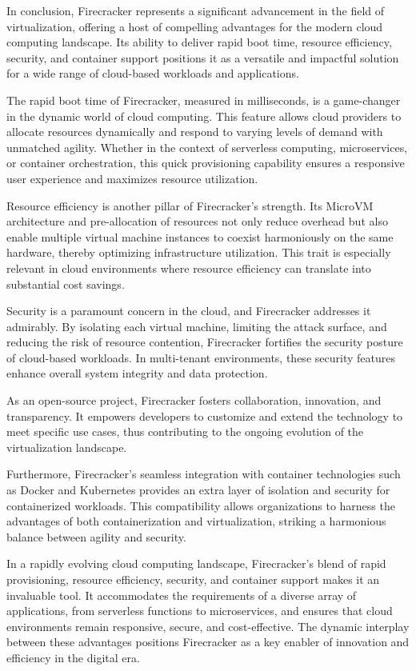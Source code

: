 \documentclass[conference]{IEEEtran}
\begin{document}
In conclusion, Firecracker represents a significant advancement in the field of virtualization, offering a host of compelling advantages for the modern cloud computing landscape. Its ability to deliver rapid boot time, resource efficiency, security, and container support positions it as a versatile and impactful solution for a wide range of cloud-based workloads and applications.

The rapid boot time of Firecracker, measured in milliseconds, is a game-changer in the dynamic world of cloud computing. This feature allows cloud providers to allocate resources dynamically and respond to varying levels of demand with unmatched agility. Whether in the context of serverless computing, microservices, or container orchestration, this quick provisioning capability ensures a responsive user experience and maximizes resource utilization.

Resource efficiency is another pillar of Firecracker's strength. Its MicroVM architecture and pre-allocation of resources not only reduce overhead but also enable multiple virtual machine instances to coexist harmoniously on the same hardware, thereby optimizing infrastructure utilization. This trait is especially relevant in cloud environments where resource efficiency can translate into substantial cost savings.

Security is a paramount concern in the cloud, and Firecracker addresses it admirably. By isolating each virtual machine, limiting the attack surface, and reducing the risk of resource contention, Firecracker fortifies the security posture of cloud-based workloads. In multi-tenant environments, these security features enhance overall system integrity and data protection.

As an open-source project, Firecracker fosters collaboration, innovation, and transparency. It empowers developers to customize and extend the technology to meet specific use cases, thus contributing to the ongoing evolution of the virtualization landscape.

Furthermore, Firecracker's seamless integration with container technologies such as Docker and Kubernetes provides an extra layer of isolation and security for containerized workloads. This compatibility allows organizations to harness the advantages of both containerization and virtualization, striking a harmonious balance between agility and security.

In a rapidly evolving cloud computing landscape, Firecracker's blend of rapid provisioning, resource efficiency, security, and container support makes it an invaluable tool. It accommodates the requirements of a diverse array of applications, from serverless functions to microservices, and ensures that cloud environments remain responsive, secure, and cost-effective. The dynamic interplay between these advantages positions Firecracker as a key enabler of innovation and efficiency in the digital era.
\end{document}
